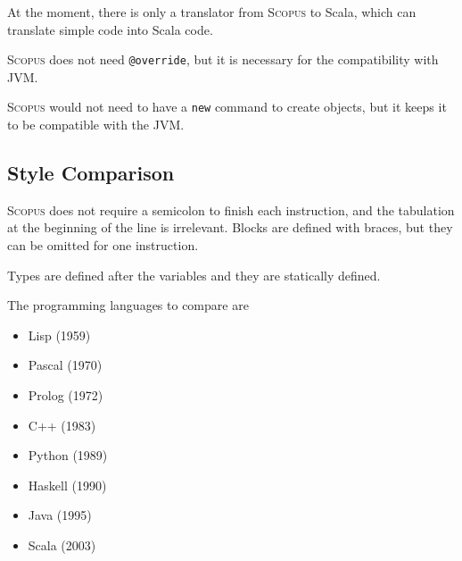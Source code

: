 \documentclass[12pt,a4paper]{article}
\makeatletter
\newcommand{\srccode}[1]{\texttt{{#1}}}
\newcommand{\reservedWord}[1]{{\color{blue}\srccode{#1}}\xspace}
\newcommand{\annotation}[1]{{\color{brown}\srccode{#1}}\xspace}
\newcommand{\snew}{\reservedWord{new}}
\newcommand{\soverride}{\annotation{@override}}
\newcommand{\Scopus}{\textsc{Scopus}\xspace}
\makeatother
\begin{document}
    At the moment, there is only a translator from \Scopus to Scala, which can translate simple code into Scala code.

    \Scopus does not need \soverride, but it is necessary for the compatibility with JVM.

    \Scopus would not need to have a \snew command to create objects, but it keeps it to be compatible with the JVM.

    \subsection{Style Comparison}


    \Scopus does not require a semicolon to finish each instruction, and the tabulation at the beginning of the line is irrelevant.
    Blocks are defined with braces, but they can be omitted for one instruction.

    Types are defined after the variables and they are statically defined.

    The programming languages to compare are
    \begin{itemize}
        \item Lisp (1959)
        \item Pascal (1970)
        \item Prolog (1972)
        \item C++ (1983)
        \item Python (1989)
        \item Haskell (1990)
        \item Java (1995)
        \item Scala (2003)
    \end{itemize}
\end{document}
